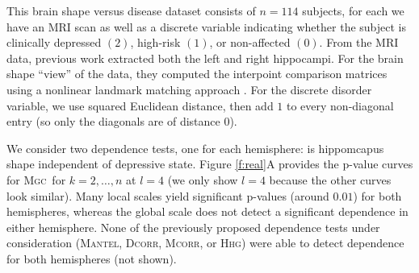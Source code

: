 \documentclass[11pt]{article}
\providecommand{\sct}[1]{{\normalfont\textsc{#1}}}
\newcommand{\Mgc}{\sct{Mgc}}
\newcommand{\Hhg}{\sct{Hhg}}
\newcommand{\Dcorr}{\sct{Dcorr}}
\newcommand{\Mcorr}{\sct{Mcorr}}
\newcommand{\Mantel}{\sct{Mantel}}
\begin{document}

This brain shape versus disease dataset consists of $n=114$ subjects, for each we have an MRI scan as well as a discrete variable indicating whether the subject is clinically depressed $(2)$, high-risk $(1)$, or non-affected $(0)$.  From the MRI data, previous work  extracted both the left and right hippocampi.   For the brain shape ``view'' of the data, they computed the interpoint comparison matrices using a nonlinear landmark matching approach \cite{ParkEtAl2008,BegEtAl2005}.
For the discrete disorder variable,
we use squared Euclidean distance, then add $1$ to every non-diagonal entry (so only the diagonals are of distance $0$). 

We consider two dependence tests, one for each hemisphere: is hippomcapus shape independent of depressive state.
Figure \ref{f:real}A provides the p-value curves for \Mgc~for $k=2,\ldots,n$ at $l=4$  (we only show $l=4$ because the other curves look similar). Many local scales yield significant p-values (around $0.01$) for both hemispheres, whereas the global scale does not detect a significant dependence in either hemisphere. None of the previously proposed dependence tests under consideration (\Mantel, \Dcorr, \Mcorr, or \Hhg) were able to detect dependence for both hemispheres (not shown).
\end{document}
